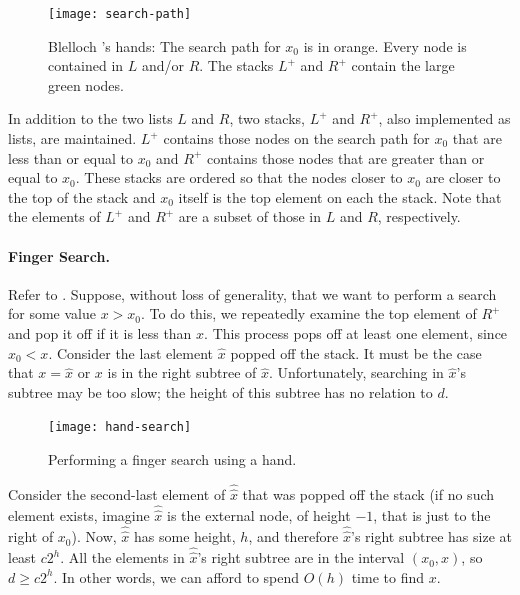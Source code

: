 \documentclass{patmorin}
\begin{document}
\begin{figure}
  \begin{center}
    \texttt{[image: search-path]}
  \end{center}
  \caption{Blelloch \etal's hands: The search path for $x_0$ is in orange. Every node is contained in $L$ and/or $R$.  The stacks $L^+$ and $R^+$ contain the large green nodes.}
\end{figure}

In addition to the two lists $L$ and $R$, two stacks, $L^+$ and $R^+$,
also implemented as lists, are maintained. $L^+$ contains those nodes
on the search path for $x_0$ that are less than or equal to $x_0$ and
$R^+$ contains those nodes that are greater than or equal to $x_0$.
These stacks are ordered so that the nodes closer to $x_0$ are closer
to the top of the stack and $x_0$ itself is the top element on each the
stack. Note that the elements of $L^+$ and $R^+$ are a subset of those
in $L$ and $R$, respectively.

\paragraph{Finger Search.}
Refer to .
Suppose, without loss of generality, that we want to perform a search for
some value $x>x_0$.  To do this, we repeatedly examine the top element
of $R^+$ and pop it off if it is less than $x$.  This process pops off
at least one element, since $x_0<x$.  Consider the last element $\hat
x$ popped off the stack.  It must be the case that $x=\hat x$ or $x$
is in the right subtree of $\hat x$.  Unfortunately, searching in $\hat
x$'s subtree may be too slow; the height of this subtree has no relation
to $d$.

\begin{figure}
  \begin{center}
    \texttt{[image: hand-search]}
  \end{center}
  \caption{Performing a finger search using a hand.}
\end{figure}

Consider the second-last element of $\hat{\hat x}$ that was popped
off the stack (if no such element exists, imagine $\hat{\hat x}$ is
the external node, of height $-1$, that is just to the right of $x_0$).
Now, $\hat{\hat x}$ has some height, $h$, and therefore $\hat{\hat x}$'s
right subtree has size at least $c2^h$.  All the elements in $\hat{\hat
x}$'s right subtree are in the interval $(x_0,x)$, so $d\ge c2^h$.
In other words, we can afford to spend $O(h)$ time to find $x$.
\end{document}
